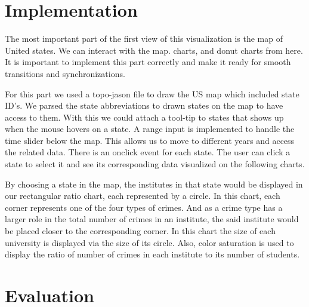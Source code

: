 \documentclass[12pt]{article}
\begin{document}
\section{Implementation}
The most important part of the first view of this visualization is the map of United states. We can interact with the map. charts, and donut charts from here. It is important to implement this part correctly and make it ready for smooth transitions and synchronizations.

For this part we used a topo-jason file to draw the US map which included state ID's. We parsed the state abbreviations to drawn states on the map to have access to them. With this we could attach a tool-tip to states that shows up when the mouse hovers on a state. A range input is implemented to handle the time slider below the map. This allows us to move to different years and access the related data. There is an onclick event for each state. The user can click a state to select it and see its corresponding data visualized on the following charts.

By choosing a state in the map, the institutes in that state would be displayed in our rectangular ratio chart, each represented by a circle. In this chart, each corner represents one of the four types of crimes. And as a crime type has a larger role in the total number of crimes in an institute, the said institute would be placed closer to the corresponding corner. In this chart the size of each university is displayed via the size of its circle. Also, color saturation is used to display the ratio of number of crimes in each institute to its number of students.

\section{Evaluation}



 

\end{document}
